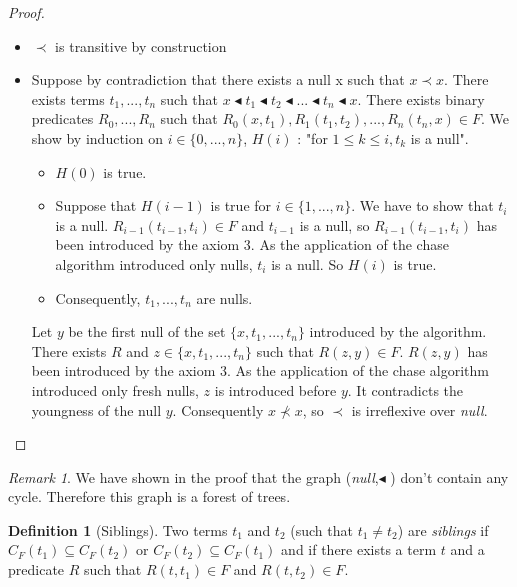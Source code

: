 \documentclass{article}
\theoremstyle{definition}
\newtheorem{definition}{Definition}[section]
\theoremstyle{remark}
\newtheorem{remark}{Remark}[section]
\begin{document}
\begin{proof}
\begin{itemize}
\item $\prec$ is transitive by construction
\item Suppose by contradiction that there exists a null x such that $x \prec x$. There exists terms $t_1,...,t_n$ such that $x \blacktriangleleft t_1 \blacktriangleleft t_2 \blacktriangleleft ... \blacktriangleleft t_n \blacktriangleleft x$. There exists binary predicates $R_0,...,R_n$ such that $R_0(x,t_1),R_1(t_1,t_2),...,R_n(t_n,x) \in F$. We show by induction on $i\in \{0,...,n\}$, $H(i)$ : "for $1 \leq k \leq i,t_k$ is a null".
\begin{itemize}
\item $H(0)$ is true.
\item Suppose that $H(i-1)$ is true for $i \in \{1,...,n\}$. We have to show that $t_i$ is a null. $R_{i-1}(t_{i-1},t_i) \in F$ and $t_{i-1}$ is a null, so $R_{i-1}(t_{i-1},t_i)$ has been introduced by the axiom 3. As the application of the chase algorithm introduced only nulls, $t_i$ is a null. So $H(i)$ is true.
\item Consequently, $t_1,...,t_n$ are nulls.
\end{itemize}
Let $y$ be the first null of the set $\{x,t_1,...,t_n\}$  introduced by the algorithm. There exists $R$ and $z \in \{x,t_1,...,t_n\}$ such that $R(z,y) \in F$. $R(z,y)$ has been introduced by the axiom 3. As the application of the chase algorithm introduced only fresh nulls, $z$ is introduced before $y$. It contradicts the youngness of the null $y$. Consequently $x \nprec x$, so $\prec$ is irreflexive over \emph{null}.
\end{itemize}
\end{proof}

\begin{remark}
We have shown in the proof that the graph (\emph{null},$\blacktriangleleft$ ) don't contain any cycle. Therefore this graph is a forest of trees.
\end{remark}

\begin{definition}[Siblings]
Two terms $t_1$ and $t_2$ (such that $t_1 \neq t_2$) are \emph{siblings} if $C_F(t_1) \subseteq C_F(t_2)$ or $C_F(t_2) \subseteq C_F(t_1)$ and if there exists a term $t$ and a predicate $R$ such that $R(t,t_1) \in F$ and $R(t,t_2) \in F$.
\end{definition}
\end{document}
